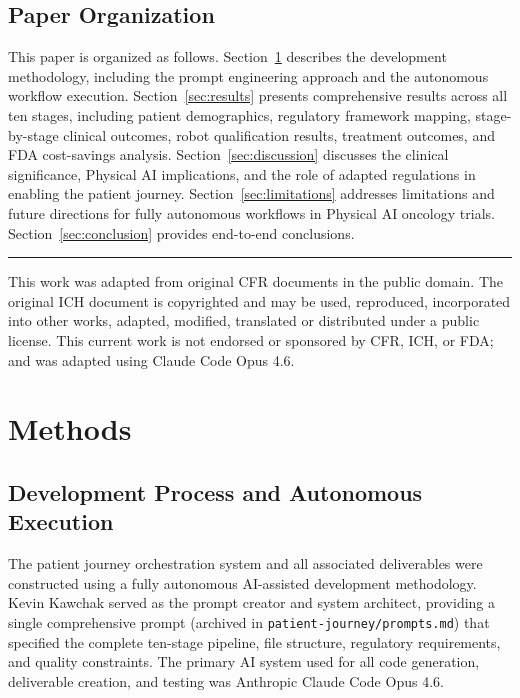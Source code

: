 \documentclass{article}
\begin{document}
\subsection{Paper Organization}

This paper is organized as follows. Section~\ref{sec:methods} describes the development methodology, including the prompt engineering approach and the autonomous workflow execution. Section~\ref{sec:results} presents comprehensive results across all ten stages, including patient demographics, regulatory framework mapping, stage-by-stage clinical outcomes, robot qualification results, treatment outcomes, and FDA cost-savings analysis. Section~\ref{sec:discussion} discusses the clinical significance, Physical AI implications, and the role of adapted regulations in enabling the patient journey. Section~\ref{sec:limitations} addresses limitations and future directions for fully autonomous workflows in Physical AI oncology trials. Section~\ref{sec:conclusion} provides end-to-end conclusions.

\vspace{0.1cm}
\noindent\rule{\textwidth}{0.4pt}
\vspace{0.05cm}

{\footnotesize This work was adapted from original CFR documents in the public domain. The original ICH document is copyrighted and may be used, reproduced, incorporated into other works, adapted, modified, translated or distributed under a public license. This current work is not endorsed or sponsored by CFR, ICH, or FDA; and was adapted using Claude Code Opus 4.6.}

\section{Methods}
\label{sec:methods}

\subsection{Development Process and Autonomous Execution}

The patient journey orchestration system and all associated deliverables were constructed using a fully autonomous AI-assisted development methodology. Kevin Kawchak served as the prompt creator and system architect, providing a single comprehensive prompt (archived in \texttt{patient-journey/prompts.md}) that specified the complete ten-stage pipeline, file structure, regulatory requirements, and quality constraints. The primary AI system used for all code generation, deliverable creation, and testing was Anthropic Claude Code Opus 4.6.
\end{document}
